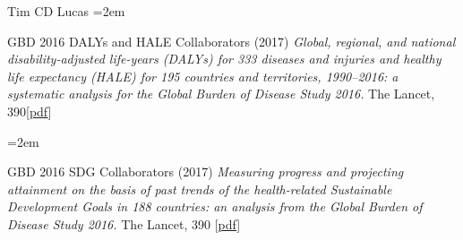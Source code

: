 \documentclass{scrartcl}
\newcommand{\Description}[1]{\hangindent=2em\hangafter=0\noindent\raggedright\footnotesize{#1}\par\normalsize\vspace{1em}} %
\begin{document}
\begin{cv}{Tim {\Large CD} Lucas}
\Description{GBD 2016 DALYs and HALE Collaborators (2017) \emph{Global, regional, and national disability-adjusted life-years (DALYs) for 333 diseases and injuries and healthy life expectancy (HALE) for 195 countries and territories, 1990--2016: a systematic analysis for the Global Burden of Disease Study 2016.} The Lancet, 390[\href{https://www.thelancet.com/action/showPdf?pii=S0140-6736\%2817\%2932130-X}{pdf}]}

\Description{GBD 2016 SDG Collaborators (2017) \emph{Measuring progress and projecting attainment on the basis of past trends of the health-related Sustainable Development Goals in 188 countries: an analysis from the Global Burden of Disease Study 2016.} The Lancet, 390 [\href{https://www.thelancet.com/action/showPdf?pii=S0140-6736\%2817\%2932336-X}{pdf}]}



\end{cv}
\end{document}
